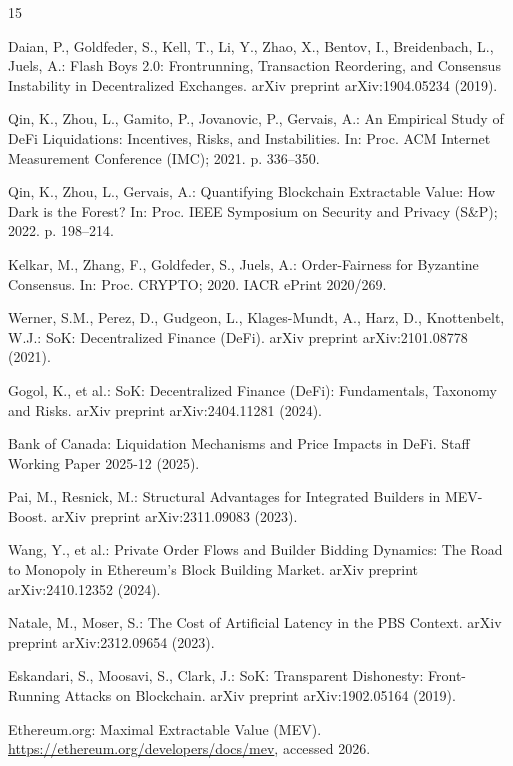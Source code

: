\documentclass{llncs}
\begin{document}
\begin{thebibliography}{15}

Daian, P., Goldfeder, S., Kell, T., Li, Y., Zhao, X., Bentov, I.,
Breidenbach, L., Juels, A.: Flash Boys 2.0: Frontrunning, Transaction
Reordering, and Consensus Instability in Decentralized Exchanges. arXiv
preprint arXiv:1904.05234 (2019).

Qin, K., Zhou, L., Gamito, P., Jovanovic, P., Gervais, A.: An Empirical
Study of DeFi Liquidations: Incentives, Risks, and Instabilities. In:
Proc. ACM Internet Measurement Conference (IMC); 2021. p. 336--350.

Qin, K., Zhou, L., Gervais, A.: Quantifying Blockchain Extractable
Value: How Dark is the Forest? In: Proc. IEEE Symposium on Security and
Privacy (S\&P); 2022. p. 198--214.

Kelkar, M., Zhang, F., Goldfeder, S., Juels, A.: Order-Fairness for
Byzantine Consensus. In: Proc. CRYPTO; 2020. IACR ePrint 2020/269.

Werner, S.M., Perez, D., Gudgeon, L., Klages-Mundt, A., Harz, D.,
Knottenbelt, W.J.: SoK: Decentralized Finance (DeFi). arXiv preprint
arXiv:2101.08778 (2021).

Gogol, K., et al.: SoK: Decentralized Finance (DeFi): Fundamentals,
Taxonomy and Risks. arXiv preprint arXiv:2404.11281 (2024).

Bank of Canada: Liquidation Mechanisms and Price Impacts in DeFi. Staff
Working Paper 2025-12 (2025).

Pai, M., Resnick, M.: Structural Advantages for Integrated Builders in
MEV-Boost. arXiv preprint arXiv:2311.09083 (2023).

Wang, Y., et al.: Private Order Flows and Builder Bidding Dynamics: The
Road to Monopoly in Ethereum's Block Building Market. arXiv preprint
arXiv:2410.12352 (2024).

Natale, M., Moser, S.: The Cost of Artificial Latency in the PBS
Context. arXiv preprint arXiv:2312.09654 (2023).

Eskandari, S., Moosavi, S., Clark, J.: SoK: Transparent Dishonesty:
Front-Running Attacks on Blockchain. arXiv preprint arXiv:1902.05164
(2019).

Ethereum.org: Maximal Extractable Value (MEV). \url{https://ethereum.org/developers/docs/mev}, accessed 2026.


\end{thebibliography}
\end{document}
